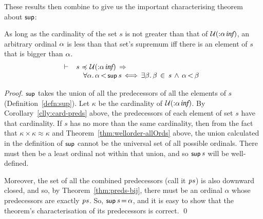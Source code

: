\documentclass[11pt]{llncs}
\renewcommand{\HOLConst}[1]{{\textsf{\upshape\small #1}}}
\renewcommand{\HOLTyOp}[1]{\mbox{\fontencoding{T1}\fontfamily{bch}\fontseries{m}\fontshape{it}\fontsize{9.5}{10}\selectfont #1}}
\renewcommand{\HOLinline}[1]{\ensuremath{#1}}
\newcommand{\holthmenv}[1]{\begin{array}[t]{l}#1\end{array}}
\begin{document}
These results then combine to give us the important characterising theorem about \HOLinline{\HOLConst{sup}}:
\begin{theorem}
\label{thm:sup-thm}
As long as the cardinality of the set $s$ is not greater than that of \HOLinline{\ensuremath{\cal{U}}(\ensuremath{{:}}\ensuremath{\alpha}\,\HOLTyOp{inf})}, an arbitrary ordinal \HOLinline{\HOLFreeVar{\ensuremath{\alpha}}} is less than that set's supremum iff there is an element of $s$ that is bigger than \HOLinline{\HOLFreeVar{\ensuremath{\alpha}}}.
\[
\vdash \;
\holthmenv{\HOLFreeVar{s}\,\ensuremath{{\,\HOLTokenIsPrefix\,}}\,\ensuremath{\cal{U}}(\ensuremath{{:}}\ensuremath{\alpha}\,\HOLTyOp{inf})\,\HOLTokenImp{}\\
\,\,\,\,\,\,\ensuremath{{\forall}}\HOLBoundVar{\ensuremath{\alpha}}\ensuremath{.}\,\HOLBoundVar{\ensuremath{\alpha}}\,\ensuremath{{<}}\,\HOLConst{sup}\,\HOLFreeVar{s}\,\ensuremath{{\iff}}\,\ensuremath{{\exists}}\HOLBoundVar{\ensuremath{\beta}}\ensuremath{.}\,\HOLBoundVar{\ensuremath{\beta}}\,\HOLTokenIn{}\,\HOLFreeVar{s}\,\HOLTokenConj{}\,\HOLBoundVar{\ensuremath{\alpha}}\,\ensuremath{{<}}\,\HOLBoundVar{\ensuremath{\beta}}}
\]
\end{theorem}
\begin{proof}
\HOLinline{\HOLConst{sup}} takes the union of all the predecessors of all the elements of $s$ (Definition~\ref{defn:sup}).
Let $\kappa$ be the cardinality of \HOLinline{\ensuremath{\cal{U}}(\ensuremath{{:}}\ensuremath{\alpha}\,\HOLTyOp{inf})}.
By Corollary~\ref{clly:card-preds} above, the predecessors of each element of set $s$ have that cardinality.
If $s$ has no more than the same cardinality, then from the fact that $\kappa \times \kappa \approx \kappa$ and Theorem~\ref{thm:wellorder-allOrds} above, the union calculated in the definition of \HOLinline{\HOLConst{sup}} cannot be the universal set of all possible ordinals.
There must then be a least ordinal not within that union, and so \HOLinline{\HOLConst{sup}\,\HOLFreeVar{s}} will be well-defined.

Moreover, the set of all the combined predecessors (call it \HOLinline{\HOLFreeVar{ps}}) is also downward closed, and so, by Theorem~\ref{thm:preds-bij}, there must be an ordinal $\alpha$ whose predecessors are exactly \HOLinline{\HOLFreeVar{ps}}.
So, \HOLinline{\HOLConst{sup}\,\HOLFreeVar{s}\,{\ensuremath{=}}\,\HOLFreeVar{\ensuremath{\alpha}}}, and it is easy to show that the theorem's characterisation of its predecessors is correct.
\qed
\end{proof}
\end{document}
